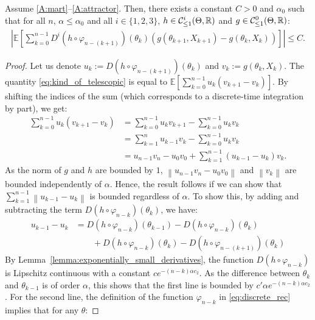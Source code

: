 \documentclass{article}
\newcommand{\R}{\mathbb{R}}
\newcommand\E{\mathbb{E}}
\newcommand\esp[1]{\E\left[#1\right]}
\newcommand\abs[1]{\left|#1\right|}
\newcommand\norm[1]{\left\|#1\right\|}
\newcommand\cont[3][]{\mathcal{C}^{#2}_{\ifthenelse{\equal{#1}{all}}{}{\le1}}(#3,\R)}
\begin{document}
\begin{lemma}\label{lem:kind_of_telescopic_sum_bound}
    Assume \ref{A:mart}--\ref{A:attractor}. Then, there exists a constant $C>0$ and $\alpha_0$ such that for all $n$, $\alpha\le\alpha_0$ and all $i\in\{1,2,3\}$, $h\in\cont{i}{\Theta}$ and $g\in\cont{0}{\Theta}$:
    \begin{align}
        \label{eq:kind_of_telescopic}
        \abs{\esp{\sum_{k=0}^{n-1}D^i(h \circ \varphi_{n-(k+1)})(\theta_{k})\left( g(\theta_{k+1}, X_{k+1}) - g(\theta_{k}, X_{k}) \right)}}\le C.
    \end{align}
\end{lemma}
\begin{proof}
    Let us denote $u_k:=D(h \circ \varphi_{n-(k+1)})(\theta_{k})$ and $v_k:=g(\theta_k,X_k)$. The quantity \eqref{eq:kind_of_telescopic} is equal to $\esp{\sum_{k=0}^{n-1} u_k(v_{k+1}-v_{k})}$. By shifting the indices of the sum (which corresponds to a discrete-time integration by part), we get: 
    \begin{align}
        \sum_{k=0}^{n-1} u_k(v_{k+1}-v_{k})&= \sum_{k=0}^{n-1} u_k v_{k+1}-\sum_{k=0}^{n-1}u_kv_{k}\nonumber\\
        &= \sum_{k=1}^{n} u_{k-1} v_{k}-\sum_{k=0}^{n-1}u_k v_{k} \\
        &= u_{n-1}v_n - u_0v_0 + \sum_{k=1}^{n-1} (u_{k-1}-u_k)v_k.\label{eq:telescopic3}
    \end{align}
    As the norm of $g$ and $h$ are bounded by $1$, $\norm{u_{n-1}v_n - u_0v_0}$ and $\norm{v_k}$ are bounded independently of $\alpha$.  Hence, the result follows if we can show that $\sum_{k=1}^{n-1} \norm{u_{k-1}-u_k}$ is bounded regardless of $\alpha$. To show this, by adding and subtracting the term $D(h \circ \varphi_{n-k})(\theta_{k})$, we have: 
    \begin{align*}
        u_{k-1}-u_k &= D(h \circ \varphi_{n-k})(\theta_{k-1}) - D(h \circ \varphi_{n-k})(\theta_{k}) \\
        &\qquad + D(h \circ \varphi_{n-k})(\theta_{k}) - D(h \circ \varphi_{n-(k+1)})(\theta_{k})
    \end{align*}
    By Lemma~\ref{lemma:exponentially_small_derivatives}, the function $D(h \circ \varphi_{n-k})$ is Lipschitz continuous with a constant $c e^{-(n-k)\alpha c_2}$. As the difference between $\theta_k$ and $\theta_{k-1}$ is of order $\alpha$, this shows that the first line is bounded by $c' \alpha e^{-(n-k)\alpha c_2}$. For the second line, the definition of the function $\varphi_{n-k}$ in \eqref{eq:discrete_rec} implies that for any $\theta$:

\end{proof}
\end{document}

